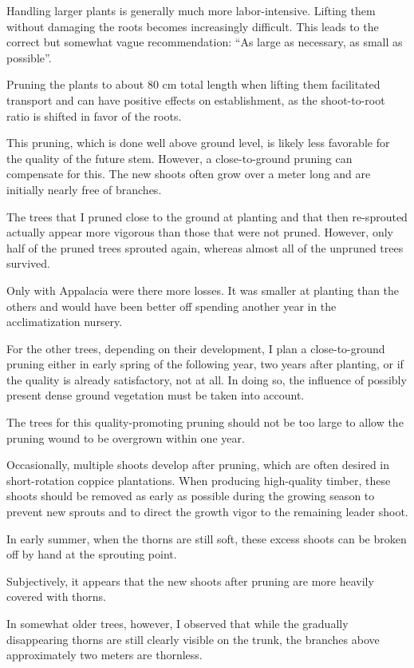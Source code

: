Handling larger plants is generally much more labor-intensive. Lifting them without damaging the roots becomes increasingly difficult. This leads to the correct but somewhat vague recommendation: \enquote{As large as necessary, as small as possible}.

Pruning the plants to about 80 cm total length when lifting them facilitated transport and can have positive effects on establishment, as the shoot-to-root ratio is shifted in favor of the roots.

This pruning, which is done well above ground level, is likely less favorable for the quality of the future stem. However, a close-to-ground pruning can compensate for this. The new shoots often grow over a meter long and are initially nearly free of branches.

The trees that I pruned close to the ground at planting and that then re-sprouted actually appear more vigorous than those that were not pruned. However, only half of the pruned trees sprouted again, whereas almost all of the unpruned trees survived.

Only with Appalacia were there more losses. It was smaller at planting than the others and would have been better off spending another year in the acclimatization nursery.

For the other trees, depending on their development, I plan a close-to-ground pruning either in early spring of the following year, two years after planting, or if the quality is already satisfactory, not at all. In doing so, the influence of possibly present dense ground vegetation must be taken into account.

The trees for this quality-promoting pruning should not be too large to allow the pruning wound to be overgrown within one year.

Occasionally, multiple shoots develop after pruning, which are often desired in short-rotation coppice plantations. When producing high-quality timber, these shoots should be removed as early as possible during the growing season to prevent new sprouts and to direct the growth vigor to the remaining leader shoot.

In early summer, when the thorns are still soft, these excess shoots can be broken off by hand at the sprouting point.

Subjectively, it appears that the new shoots after pruning are more heavily covered with thorns.

In somewhat older trees, however, I observed that while the gradually disappearing thorns are still clearly visible on the trunk, the branches above approximately two meters are thornless.

